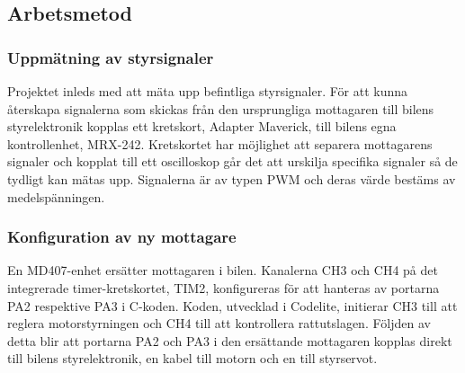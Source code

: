 \documentclass[a4paper]{article}
\begin{document}

\subsection{Arbetsmetod}
\subsubsection{Uppmätning av styrsignaler}
Projektet inleds med att mäta upp befintliga styrsignaler. För att kunna återskapa signalerna som skickas från den ursprungliga mottagaren till bilens styrelektronik kopplas ett kretskort, Adapter Maverick, till bilens egna kontrollenhet, MRX-242. Kretskortet har möjlighet att separera mottagarens signaler och kopplat till ett oscilloskop går det att urskilja specifika signaler så de tydligt kan mätas upp. Signalerna är av typen PWM och deras värde bestäms av medelspänningen. 


\subsubsection{Konfiguration av ny mottagare}
En MD407-enhet ersätter mottagaren i bilen. Kanalerna CH3 och CH4 på det integrerade timer-kretskortet, TIM2, konfigureras för att hanteras av portarna PA2 respektive PA3 i C-koden. Koden, utvecklad i Codelite, initierar CH3 till att reglera motorstyrningen och CH4 till att kontrollera rattutslagen. Följden av detta blir att portarna PA2 och PA3 i den ersättande mottagaren kopplas direkt till bilens styrelektronik, en kabel till motorn och en till styrservot. 
\end{document}
